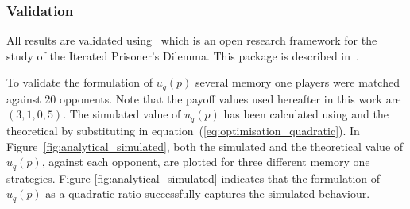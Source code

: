 \documentclass[10pt]{article}
\begin{document}
\subsubsection{Validation}

All results are validated using~\cite{axelrodproject} which is an open research
framework for the study of the Iterated Prisoner's Dilemma. This package is
described in~\cite{Knight2016}.

To validate the formulation of \(u_q(p)\) several memory one players were 
matched against 20 opponents. Note that the payoff values  used hereafter in this
work are \((3, 1, 0, 5)\). 
The simulated value of \(u_q(p)\) has been calculated using \cite{axelrodproject}
and the theoretical by  substituting in equation~(\ref{eq:optimisation_quadratic}).
In Figure~\ref{fig:analytical_simulated}, both the simulated and the theoretical
value of \(u_q(p)\), against each opponent, are plotted for three different memory
one strategies. Figure \ref{fig:analytical_simulated} indicates that the 
formulation of \(u_q(p)\) as a quadratic ratio successfully captures the 
simulated behaviour.
\end{document}
